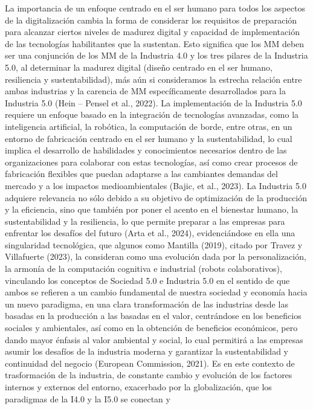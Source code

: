 \documentclass{article}
\begin{document}
La importancia de un enfoque centrado en el ser humano para todos los
aspectos de la digitalización cambia la forma de considerar los
requisitos de preparación para alcanzar ciertos niveles de madurez
digital y capacidad de implementación de las tecnologías habilitantes
que la sustentan. Esto significa que los MM deben ser una conjunción de
los MM de la Industria 4.0 y los tres pilares de la Industria 5.0, al
determinar la madurez digital (diseño centrado en el ser humano,
resiliencia y sustentabilidad), más aún si consideramos la estrecha
relación entre ambas industrias y la carencia de MM específicamente
desarrollados para la Industria 5.0 (Hein -- Pensel et al., 2022). La
implementación de la Industria 5.0 requiere un enfoque basado en la
integración de tecnologías avanzadas, como la inteligencia artificial,
la robótica, la computación de borde, entre otras, en un entorno de
fabricación centrado en el ser humano y la sustentabilidad, lo cual
implica el desarrollo de habilidades y conocimientos necesarios dentro
de las organizaciones para colaborar con estas tecnologías, así como
crear procesos de fabricación flexibles que puedan adaptarse a las
cambiantes demandas del mercado y a los impactos medioambientales
(Bajic, et al., 2023). La Industria 5.0 adquiere relevancia no sólo
debido a su objetivo de optimización de la producción y la eficiencia,
sino que también por poner el acento en el bienestar humano, la
sustentabilidad y la resiliencia, lo que permite preparar a las empresas
para enfrentar los desafíos del futuro (Arta et al., 2024),
evidenciándose en ella una singularidad tecnológica, que algunos como
Mantilla (2019), citado por Travez y Villafuerte (2023), la consideran
como una evolución dada por la personalización, la armonía de la
computación cognitiva e industrial (robots colaborativos), vinculando
los conceptos de Sociedad 5.0 e Industria 5.0 en el sentido de que ambos
se refieren a un cambio fundamental de nuestra sociedad y economía hacia
un nuevo paradigma, en una clara transformación de las industrias desde
las basadas en la producción a las basadas en el valor, centrándose en
los beneficios sociales y ambientales, así como en la obtención de
beneficios económicos, pero dando mayor énfasis al valor ambiental y
social, lo cual permitirá a las empresas asumir los desafíos de la
industria moderna y garantizar la sustentabilidad y continuidad del
negocio (European Commission, 2021). Es en este contexto de
trasformación de la industria, de constante cambio y evolución de los
factores internos y externos del entorno, exacerbado por la
globalización, que los paradigmas de la I4.0 y la I5.0 se conectan y
\end{document}
